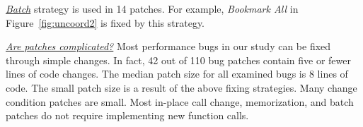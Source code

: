 \underline{\it Batch} strategy is used in 14 patches. 
For example, {\it Bookmark All} in Figure~\ref{fig:uncoord2} is fixed by this strategy.   

\underline{\it Are patches complicated?}
Most performance bugs in our study can be fixed through simple changes. 
In fact, 42 out of 110 bug patches contain five or fewer lines of code changes. 
The median patch size for all examined bugs is 8 lines of code.
The small patch size is a result of the above fixing strategies.
Many change condition patches are small. Most in-place call change, memorization, and batch patches do not require implementing new function calls.

